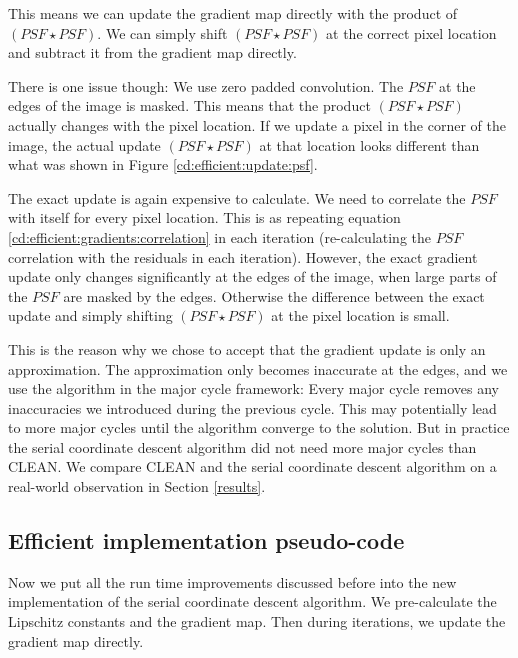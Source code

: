 This means we can update the gradient map directly with the product of $(PSF \star PSF)$. We can simply shift $(PSF \star PSF)$ at the correct pixel location and subtract it from the gradient map directly.

There is one issue though: We use zero padded convolution. The $PSF$ at the edges of the image is masked. This means that the product $(PSF \star PSF)$ actually changes with the pixel location. If we update a pixel in the corner of the image, the actual update $(PSF \star PSF)$ at that location looks different than what was shown in Figure \ref{cd:efficient:update:psf}.

The exact update is again expensive to calculate. We need to correlate the $PSF$ with itself for every pixel location. This is as repeating equation \eqref{cd:efficient:gradients:correlation} in each iteration (re-calculating the $PSF$ correlation with the residuals in each iteration). However, the exact gradient update only changes significantly at the edges of the image, when large parts of the $PSF$ are masked by the edges. Otherwise the difference between the exact update and simply shifting $(PSF \star PSF)$ at the pixel location is small.

This is the reason why we chose to accept that the gradient update is only an approximation. The approximation only becomes inaccurate at the edges, and we use the algorithm in the major cycle framework: Every major cycle removes any inaccuracies we introduced during the previous cycle. This may potentially lead to more major cycles until the algorithm converge to the solution. But in practice the serial coordinate descent algorithm did not need more major cycles than CLEAN. We compare CLEAN and the serial coordinate descent algorithm on a real-world observation in Section \ref{results}.

\subsection{Efficient implementation pseudo-code}
Now we put all the run time improvements discussed before into the new implementation of the serial coordinate descent algorithm. We pre-calculate the Lipschitz constants and the gradient map. Then during iterations, we update the gradient map directly.

